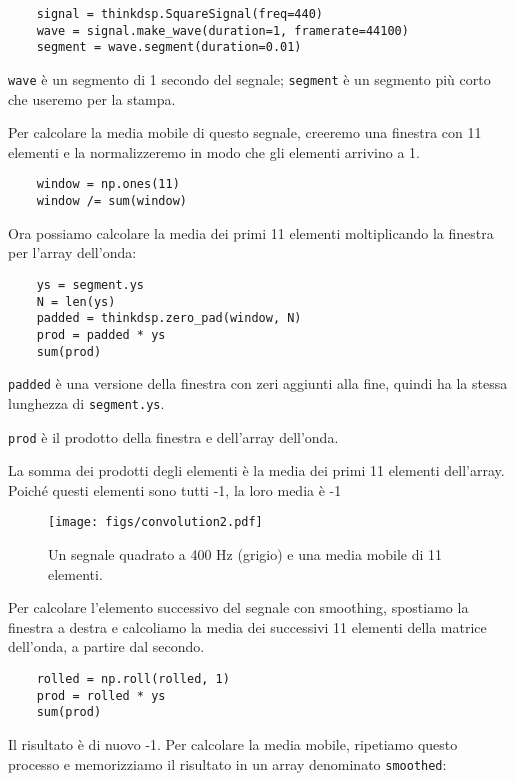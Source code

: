 \documentclass[12pt]{book} \usepackage[width=5.5in,height=8.5in, hmarginratio=3:2,vmarginratio=1:1]{geometry}
\begin{document}
\begin{verbatim} 
    signal = thinkdsp.SquareSignal(freq=440)
    wave = signal.make_wave(duration=1, framerate=44100)
    segment = wave.segment(duration=0.01)
 \end{verbatim} 

{\tt wave} è un segmento di 1 secondo del segnale; {\tt segment} è un segmento più corto che useremo per la stampa.

Per calcolare la media mobile di questo segnale, creeremo una finestra con 11 elementi e la normalizzeremo in modo che gli elementi arrivino a 1.

\begin{verbatim} 
    window = np.ones(11)
    window /= sum(window)
 \end{verbatim} 

Ora possiamo calcolare la media dei primi 11 elementi moltiplicando la finestra per l'array dell'onda:

\begin{verbatim} 
    ys = segment.ys
    N = len(ys)
    padded = thinkdsp.zero_pad(window, N)
    prod = padded * ys
    sum(prod)
 \end{verbatim} 

{\tt padded} è una versione della finestra con zeri aggiunti alla fine, quindi ha la stessa lunghezza di {\tt segment.ys}.

{\tt prod} è il prodotto della finestra e dell'array dell'onda.

La somma dei prodotti degli elementi è la media dei primi 11 elementi dell'array. Poiché questi elementi sono tutti -1, la loro media è -1

\begin{figure} 

\centerline{\texttt{[image: figs/convolution2.pdf]}} \caption{Un segnale quadrato a 400 Hz (grigio) e una media mobile di 11 elementi.} \label{fig.convolution2} \end{figure} 

Per calcolare l'elemento successivo del segnale con smoothing, spostiamo la finestra a destra e calcoliamo la media dei successivi 11 elementi della matrice dell'onda, a partire dal secondo.

\begin{verbatim} 
    rolled = np.roll(rolled, 1)
    prod = rolled * ys
    sum(prod)
 \end{verbatim} 

Il risultato è di nuovo -1. Per calcolare la media mobile, ripetiamo questo processo e memorizziamo il risultato in un array denominato {\tt smoothed}:
\end{document}

